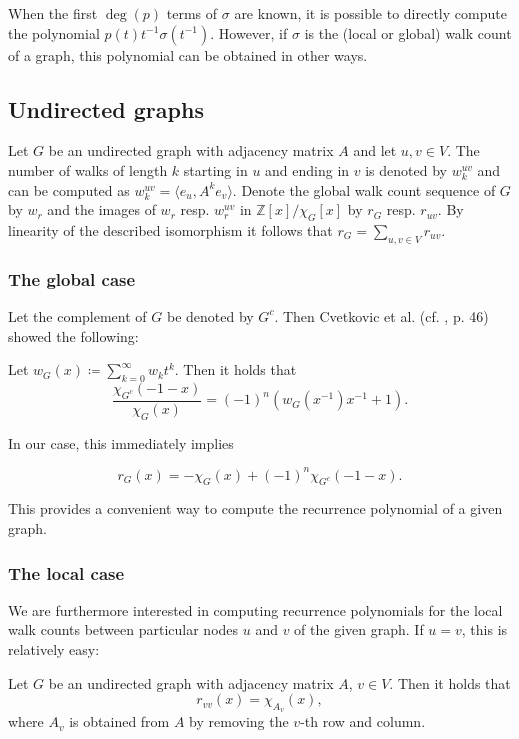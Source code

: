 \documentclass[a4paper,12pt]{article}
\begin{document}
When the first $\deg(p)$ terms of $\sigma$ are known, it is possible to directly compute the polynomial $p(t) t^{-1} \sigma\left(t^{-1}\right)$. However, if $\sigma$ is the (local or global) walk count of a graph, this polynomial can be obtained in other ways.

\subsection{Undirected graphs}

Let $G$ be an undirected graph with adjacency matrix $A$ and let $u,v \in V$. The number of walks of length $k$ starting in $u$ and ending in $v$ is denoted by $w_k^{uv}$ and can be computed as $w_k^{uv} = \langle e_u,A^ke_v\rangle$. Denote the global walk count sequence of $G$ by $w_r$ and the images of $w_r$ resp. $w_r^{uv}$ in $\mathbb{Z}[x]/\chi_G[x]$ by $r_G$ resp. $r_{uv}$. By linearity of the described isomorphism it follows that $r_G = \sum_{u,v\in V}r_{uv}$.

\subsubsection{The global case}

Let the complement of $G$ be denoted by $G^c$. Then Cvetkovic et al. (cf. \cite{cvetkovic1980spectra}, p. 46) showed the following: 

\begin{thm} Let $w_G(x) \coloneqq \sum_{k=0}^\infty w_k t^k$. Then it holds that
$$
\frac{\chi_{G^c}(-1-x)}{\chi_G(x)} = (-1)^n \left(w_G\left(x^{-1}\right)x^{-1} + 1\right). 
$$
\end{thm}
In our case, this immediately implies

\begin{cor}
$$
r_G(x) = -\chi_G(x) + (-1)^n \chi_{G^c}(-1-x).
$$
\end{cor}
This provides a convenient way to compute the recurrence polynomial of a given graph.


\subsubsection{The local case}

We are furthermore interested in computing recurrence polynomials for the local walk counts between particular nodes $u$ and $v$ of the given graph.
If $u=v$, this is relatively easy:

\begin{claim}\label{cl:closed_walks}
Let $G$ be an undirected graph with adjacency matrix $A$, $v\in V$. Then it holds that
$$
r_{vv}(x) = \chi_{A_v}(x),
$$
where $A_v$ is obtained from $A$ by removing the $v$-th row and column.
\end{claim}
\end{document}
